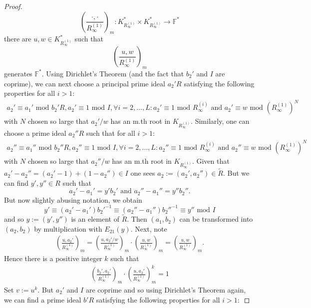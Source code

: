 \documentclass[12pt]{amsart}
\theoremstyle{definition}\newtheorem{definition}[theorem]{Definition}
\theoremstyle{remark}\newtheorem{remark}[theorem]{Remark}
\theoremstyle{definition}\newtheorem{case}{Case}
\begin{document}
\begin{proof}
\begin{equation*}
\left(\frac{\cdot,\cdot}{R_{\infty}^{(1)}}\right)_m:K_{R_{\infty}^{(1)}}^*\times K_{R_{\infty}^{(1)}}^*\to\mathbb{F}^*
\end{equation*}
there are $u,w\in K_{R_{\infty}^{(1)}}^*$ such that 
\begin{equation*}
\left(\frac{u,w}{R_{\infty}^{(1)}}\right)_m
\end{equation*}
generates $\mathbb{F}^*.$ Using Dirichlet's Theorem (and the fact that $b_2'$ and $I$ are coprime), we can next choose a principal prime ideal $a_2'R$ satisfying the following properties for all $i>1$: 
\begin{align*}
a_2'\equiv a_1'\text{ mod }b_2'R,a_2'\equiv 1\text{ mod }I,\forall i=2,\dots,L:a_2'\equiv 1\text{ mod }R_{\infty}^{(i)}\text{ and }a_2'\equiv w\text{ mod }(R_{\infty}^{(1)})^N
\end{align*}
with $N$ chosen so large that $a_2'/w$ has an m.th root in $K_{R_{\infty}^{(1)}}.$ Similarly, one can choose a prime ideal $a_2''R$ such that for all $i>1:$
\begin{align*}
a_2''\equiv a_1''\text{ mod }b_2''R,a_2''\equiv 1\text{ mod }I,\forall i=2,\dots,L:a_2''\equiv 1\text{ mod }R_{\infty}^{(i)}\text{ and }a_2''\equiv w\text{ mod }(R_{\infty}^{(1)})^N
\end{align*}
with $N$ chosen so large that $a_2''/w$ has an m.th root in $K_{R_{\infty}^{(1)}}.$ Given that $a_2'-a_2''=(a_2'-1)+(1-a_2'')\in I$ one sees $a_2:=(a_2',a_2'')\in\tilde{R}$. But we can find $y',y''\in R$ such that  
\[
a_2'-a_1'=y'b_2'\text{ and }a_2''-a_1''=y''b_2''.
\]
But now slightly abusing notation, we obtain 
\[
y'\equiv (a_2'-a_1')b_2'^{-1}\equiv (a_2''-a_1'')b_2''^{-1}\equiv y''\text{ mod }I
\]
and so $y:=(y',y'')$ is an element of $\tilde{R}.$
Then $(a_1,b_2)$ can be transformed into $(a_2,b_2)$ by multiplication with $E_{21}(y)$. Next, note 
\begin{align*}
\left(\frac{u,a_2'}{R_{\infty}^{(1)}}\right)_m=\left(\frac{u,a_2'/w}{R_{\infty}^{(1)}}\right)_m\cdot\left(\frac{u,w}{R_{\infty}^{(1)}}\right)_m=\left(\frac{u,w}{R_{\infty}^{(1)}}\right)_m.
\end{align*}
Hence there is a positive integer $k$ such that 
\begin{align*}
\left(\frac{b_2',a_2'}{R_{\infty}^{(1)}}\right)_m\cdot\left(\frac{u,a_2'}{R_{\infty}^{(1)}}\right)_m^k=1
\end{align*}
Set $v:=u^k.$ But $a_2'$ and $I$ are coprime and so using Dirichlet's Theorem again, we can find a prime ideal $b'R$ satisfying the following properties for all $i>1:$

\end{proof}
\end{document}
